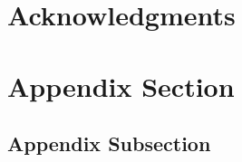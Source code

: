 \documentclass{acm_proc_article-sp}
\begin{document}
\section{Acknowledgments}


%

%
%
\appendix

\section{Appendix Section}

\subsection{Appendix Subsection}

\balancecolumns
\end{document}
